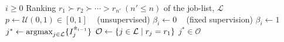 
\begin{algorithm}[t]
    \caption[Active imitation learning]{Pseudo code for choosing job 
    $J_{j^*}$ using imitation learning (dependent on iteration $i$) to collect 
    training set $\Phi^{\text{IL}i}$; either by following optimal trajectory, 
    $\pi_\star$, or preference model 
    from previous iterations, $\hat{\pi}_{i-1}$.}
    \label{pseudo:activeIL}
    \begin{algorithmic}[1]
        \Require $i\geq0$ 
        \Require Ranking $r_1 \succ r_2 \succ \cdots > r_{n'} ~ (n' \leq n)$ of 
                the job-list, $\mathcal{L}$ 
        \State $p \gets \mathcal{U}(0,1)\in [0,1]$
         ~ (unsupervised)
        \State $\beta_i \gets 0$ 
        \Else ~ (fixed supervision)  \State $\beta_i \gets 1$ 
        \EndIf
        \State \Return $j^* \gets \mathop{\rm argmax}_{j\in 
        \mathcal{L}}\{I_j^{\hat{\pi}_{i-1}}\}$
        \Else 
        \State $\mathcal{O} \gets \left\{j\in\mathcal{L}\;\middle|\;r_j=r_1\right\}$ 
        \State \Return $j^* \in\mathcal{O}$ 
        \EndIf
        \EndProcedure
    \end{algorithmic}
\end{algorithm}